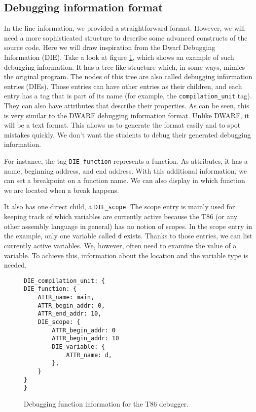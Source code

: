 \subsection{Debugging information format}
In the line information, we provided a straightforward format. However, we will
need a more sophisticated structure to describe some advanced constructs of the
source code. Here we will draw inspiration from the Dwarf Debugging Information
(DIE). Take a look at figure \ref{fig:t86dbg-die}, which shows an example of
such debugging information. It has a tree-like structure which, in some ways,
mimics the original program. The nodes of this tree are also called debugging
information entries (DIEs). Those entries can have other entries as their
children, and each entry has a tag that is part of its name (for example, the
\verb|compilation_unit| tag). They can also have attributes that describe their
properties. As can be seen, this is very similar to the DWARF debugging
information format. Unlike DWARF, it will be a text format. This allows us to
generate the format easily and to spot mistakes quickly. We don't want the
students to debug their generated debugging information.

For instance, the tag \verb|DIE_function| represents a function. As attributes,
it has a name, beginning address, and end address. With this additional
information, we can set a breakpoint on a function name. We can also display in
which function we are located when a break happens.

It also has one direct child, a \verb|DIE_scope|. The scope entry is mainly
used for keeping track of which variables are currently active because the T86
(or any other assembly language in general) has no notion of scopes. In the
scope entry in the example, only one variable called \texttt{d} exists. Thanks
to those entries, we can list currently active variables. We, however, often
need to examine the value of a variable. To achieve this, information about the
location and the variable type is needed.

\begin{figure}
    \begin{lstlisting}
DIE_compilation_unit: {
DIE_function: {
    ATTR_name: main,
    ATTR_begin_addr: 0,
    ATTR_end_addr: 10,
    DIE_scope: {
        ATTR_begin_addr: 0
        ATTR_begin_addr: 10
        DIE_variable: {
            ATTR_name: d,
        },
    }
}
}
    \end{lstlisting}
    \caption{Debugging function information for the T86 debugger.}
    \label{fig:t86dbg-die}
\end{figure}

